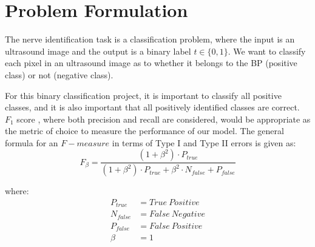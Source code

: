 \section{Problem Formulation}
The nerve identification task is a classification problem, where the input is an ultrasound image and the output is a binary label $t \in \{0,1\}$. We want to classify each pixel in an ultrasound image as to whether it belongs to the BP (positive class) or not (negative class).

For this binary classification project, it is important to classify all positive classes, and it is also important that all positively identified classes are correct. $F_1$ score , where both precision and recall are considered, would be appropriate as the metric of choice to measure the performance of our model. The general formula for an $F-measure$ in terms of Type I and Type II errors is given as:
$$F_\beta=\frac{ (1+\beta^2) \cdot P_{true} }{ (1+\beta^2) \cdot P_{true}  + \beta^2 \cdot N_{false} + P_{false} }$$

where:
\begin{align*}
P_{true} &= {True \ Positive} \\
N_{false} &= {False \ Negative} \\
P_{false} &= {False \ Positive} \\
\beta &= 1
\end{align*}